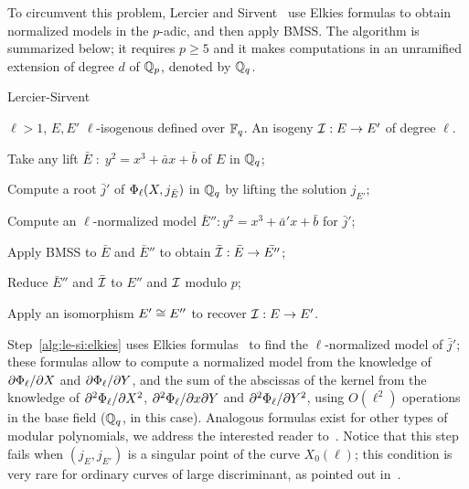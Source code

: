 To circumvent this problem, Lercier and
Sirvent~\cite{lercier+sirvent08} use Elkies formulas to obtain
normalized models in the $p$-adic, and then apply BMSS. The algorithm
is summarized below; it requires $p\ge5$ and it makes computations in
an unramified extension of degree $d$ of $\mathbb{Q}_p$, denoted by $\mathbb{Q}_q$.

\begin{algorithm}
  \label{alg:le-si}
  \caption{Lercier-Sirvent}
  \begin{algorithmic}[1]
    \REQUIRE $\ell>1$, $E,E'$ $\ell$-isogenous defined over $\mathbb{F}_q$.
    \ENSURE An isogeny $\mathcal{I}:E\rightarrow E'$ of degree $\ell$.

    \STATE \label{alg:le-si:lift1}Take any lift
    $\bar{E}\;:\;y^2=x^3+\bar{a}x+\bar{b}$ of $E$ in $\mathbb{Q}_q$;
    
    \STATE \label{alg:le-si:modpol}Compute a root $\bar{j}'$ of
    $\Phi_\ell(X,j_{\bar{E}})$ in $\mathbb{Q}_q$ by lifting the solution
    $j_{E'}$;
    
    \STATE \label{alg:le-si:elkies} Compute an $\ell$-normalized model
    $\bar{E}'':y^2=x^3+\bar{a}'x+\bar{b}$ for $\bar{j}'$;
    
    \STATE \label{alg:le-si:bmss}Apply BMSS to $\bar{E}$ and
    $\bar{E}''$ to obtain $\bar{\mathcal{I}}:\bar{E}\rightarrow\bar{E''}$;
    
    \STATE \label{alg:le-si:reduce}Reduce $\bar{E}''$ and $\bar{\mathcal{I}}$
    to $E''$ and $\mathcal{I}$ modulo $p$;
    
    \STATE \label{alg:le-si:isom}Apply an isomorphism $E'\cong E''$ to
    recover $\mathcal{I}:E\rightarrow E'$.
  \end{algorithmic}
\end{algorithm}

Step~\ref{alg:le-si:elkies} uses Elkies formulas~\cite{elkies98} to
find the $\ell$-normalized model of $\bar{j}'$; these formulas allow
to compute a normalized model from the knowledge of
$\partial\Phi_\ell/\partial X$ and $\partial\Phi_\ell/\partial
Y$, and the sum of the abscissas of the kernel from the knowledge of
$\partial^2\Phi_\ell/\partial X^2$,
$\partial^2\Phi_\ell/\partial x\partial Y$ and
$\partial^2\Phi_\ell/\partial Y^2$, using $O(\ell^2)$
operations in the base field ($\mathbb{Q}_q$, in this case). Analogous
formulas exist for other types of modular polynomials, we address the
interested reader
to~\cite{schoof95,morain95,elkies98,lercier-algorithmique}. Notice
that this step fails when $(j_E,j_{E'})$ is a singular point of the
curve $X_0(\ell)$; this condition is very rare for ordinary curves of
large discriminant, as pointed out in~\cite[$\S7$]{schoof95}.

